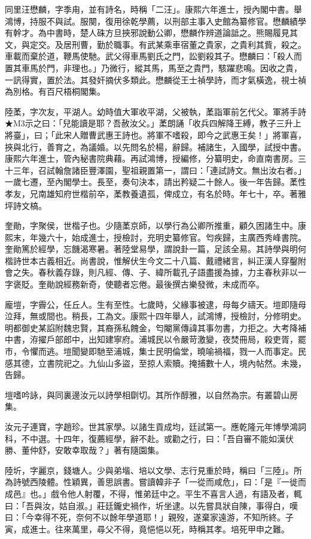 \begin{pinyinscope}
同里汪懋麟，字季甪，並有詩名，時稱「二汪」。康熙六年進士，授內閣中書。舉鴻博，持服不與試。服闋，復用徐乾學薦，以刑部主事入史館為纂修官。懋麟績學有幹才。為中書時，楚人硃方旦挾邪說動公卿，懋麟作辨道論詆之。熊賜履見其文，與定交。及居刑曹，勤於職事。有武某乘車宿董之貴家，之貴利其貲，殺之。車載而棄於道，鞭馬使馳。武父得車馬劉氏之門，訟劉殺其子。懋麟曰：「殺人而置其車馬於門，非理也。」乃微行，縱其馬，馬至之貴門，駭躍悲鳴。因收之貴，一訊得實，置於法。其發奸摘伏多類此。懋麟從王士禎學詩，而才氣橫逸，視士禎為別格。有百尺梧桐閣集。

陸葇，字次友，平湖人。幼時值大軍收平湖，父被執，葇詣軍前乞代父。軍將手詩★M3示之曰：「兒能讀是耶？吾赦汝父。」葇朗誦「收兵四解降王縛，教子三升上將臺」，曰；「此宋人贈曹武惠王詩也。將軍不嗜殺，即今之武惠王矣！」將軍喜，挾與北行，善育之，為議婚。以先問名於楊，辭歸。補諸生，入國學，試授中書。康熙六年進士，管內秘書院典藉。再試鴻博，授編修，分纂明史，命直南書房。三十三年，召試翰詹諸臣豐澤園，聖祖親置第一，謂曰：「連試詩文。無出汝右者。」一歲七遷，至內閣學士。長至，奏句決本，請出矜疑二十餘人。後一年告歸。葇性孝友，兄南雄知府世楷前卒，葇教養遺孤，俾成立，有名於時。年七十，卒。著雅坪詩文槁。

奎勛，字聚侯，世楷子也。少隨葇京師，以學行為公卿所推重，顧久困諸生中。康熙末，年幾六十，始成進士，授檢討，充明史纂修官。匄疾歸，主廣西秀峰書院。奎勛篤於經學，忘饑渴寒暑。著陸堂易學，謂說卦一篇，足該全易。其詩學與明何楷詩世本古義相近。尚書說，惟解伏生今文二十八篇、戴禮緒言，糾正漢人穿鑿附會之失。春秋義存錄，則凡經、傳、子、緯所載孔子語盡援為據，力主春秋非以一字褒貶。奎勛說經務新奇，使聽者忘倦。最後撰古樂發微，未成而卒。

龐塏，字霽公，任丘人。生有至性。七歲時，父緣事被逮，母每夕禱天。塏即隨母泣拜，無或間也。稍長，工為文。康熙十四年舉人，試鴻博，授檢討，分修明史。明都御史某諂附魏忠賢，其裔孫私餽金，匄閹黨傳諱其事勿書，力拒之。大考降補中書，洊擢戶部郎中，出知建寧府。浦城民以令嚴苛激變，夜焚冊局，殺吏胥，罷市，令懼而逃。塏聞變即馳至浦城，集士民明倫堂，曉喻禍福，戮一人而事定。民感其德，立書院祀之。九仙山多盜，至掠人索贖。掩捕數十人，境內帖然。未幾，告歸。

塏嗜吟詠，與同裏邊汝元以詩學相劘切。其所作醇雅，以自然為宗。有叢碧山房集。

汝元子連寶，字趙珍。世其家學。以諸生貢成均，廷試第一。應乾隆元年博學鴻詞科，不中選。十四年，復薦經學，辭不赴。或勸之行，曰：「吾自審不能如漢伏勝、董仲舒，安敢幸取哉？」著有隨園集。

陸圻，字麗京，錢塘人。少與弟堦、培以文學、志行見重於時，稱曰「三陸」。所為詩號西陵體。性穎異，善思誤書。嘗讀韓非子「一從而咸危」，曰：「是『一徙而成邑』也。」戲令他人射覆，不得，惟弟廷中之。平生不喜言人過，有語及者，輒曰：「吾與汝，姑自淑。」莊廷鑨史禍作，圻坐逮。以先嘗具狀自陳，事得白，嘆曰：「今幸得不死，奈何不以餘年學道耶！」親歿，遂棄家遠游，不知所終。子寅，成進士。往來萬里，尋父不得，竟悒悒以死，時稱其孝。培死甲申之難。


\end{pinyinscope}
